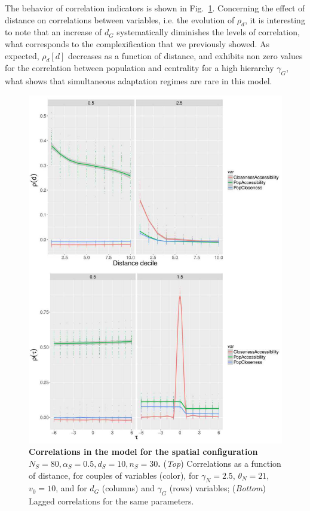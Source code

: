 \documentclass[graybox]{svmult}
\begin{document}
The behavior of correlation indicators is shown in Fig.~\ref{fig:macrocoevolexplo:correlations}. Concerning the effect of distance on correlations between variables, i.e. the evolution of $\rho_d$, it is interesting to note that an increase of $d_G$ systematically diminishes the levels of correlation, what corresponds to the complexification that we previously showed. As expected, $\rho_d\left[d\right]$ decreases as a function of distance, and exhibits non zero values for the correlation between population and centrality for a high hierarchy $\gamma_G$, what shows that simultaneous adaptation regimes are rare in this model.


\begin{figure}
\includegraphics[width=\linewidth,height=0.9\textheight]{6-1-3-fig-macrocoevolexplo-correlations.jpg}
	\caption{\textbf{Correlations in the model for the spatial configuration $N_S=80,\alpha_S=0.5,d_S=10,n_S=30$.} (\textit{Top}) Correlations as a function of distance, for couples of variables (color), for $\gamma_N = 2.5$, $\theta_N = 21$, $v_0 = 10$, and for $d_G$ (columns) and $\gamma_G$ (rows) variables; (\textit{Bottom}) Lagged correlations for the same parameters. \label{fig:macrocoevolexplo:correlations}}
\end{figure}
\end{document}
